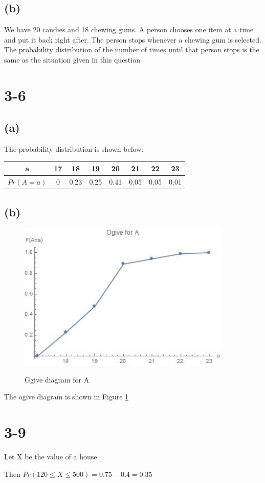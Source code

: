 \documentclass[12pt]{article}
\begin{document}
\begin{spacing}{2.0}
\subsection*{(b)}
We have 20 candies and 18 chewing gums. A person chooses one item at a time and put it back right after. The person stops whenever a chewing gum is selected. The probability distribution of the number of times until that person stops is the same as the situation given in this question

\section*{3-6}

\subsection*{(a)}

The probability distribution is shown below:

\begin{tabular}{|c|c|c|c|c|c|c|c|}
  \hline
  a & 17 & 18 & 19 & 20 & 21 & 22 & 23 \\
  \hline
  $Pr(A=a)$ & 0 & 0.23 & 0.25 & 0.41 & 0.05 & 0.05 & 0.01 \\
  \hline
\end{tabular}

\subsection*{(b)}

\begin{figure}
  \centering
  \includegraphics[width=4in]{out1}\\
  \caption{Ggive diagram for A}\label{out1}
\end{figure}

The ogive diagram is shown in Figure \ref{out1}

\section*{3-9}
Let X be the value of a house

Then $Pr(120 \le X \le 500)=0.75-0.4=0.35$

\end{spacing}
\end{document}
